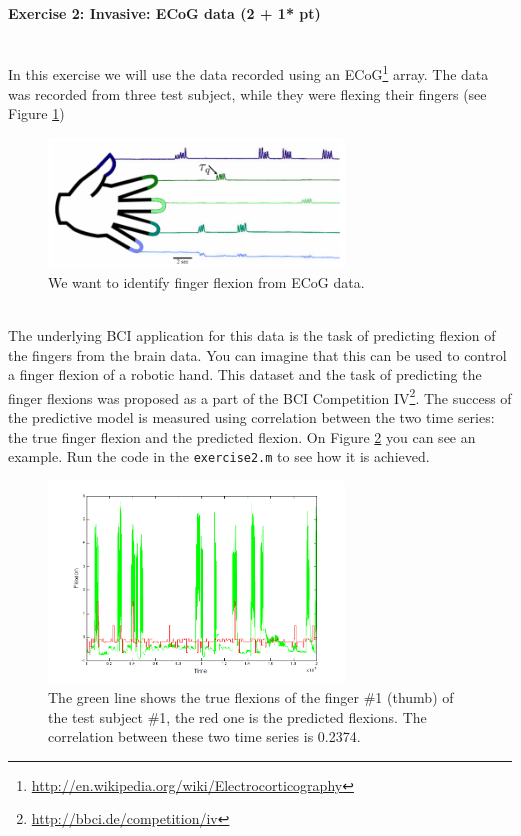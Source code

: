 \documentclass[a4paper,11pt]{article}
\newenvironment{exercise}[3]{\paragraph{Exercise #1: #2 (#3pt)}\ \\}{
\medskip}
\begin{document}
%
% 
%
\begin{exercise}{2}{Invasive: ECoG data}{2 + 1* }
In this exercise we will use the data recorded using an ECoG\footnote{\url{http://en.wikipedia.org/wiki/Electrocorticography}} array. The data was recorded from three test subject, while they were flexing their fingers (see Figure \ref{fig:fingers})
\begin{figure}[H]
   \centering
   \includegraphics[width=0.7\textwidth]{fingers.png} 
   \caption{We want to identify finger flexion from ECoG data.}
   \label{fig:fingers}
\end{figure}
\ \\
The underlying BCI application for this data is the task of predicting flexion of the fingers from the brain data. You can imagine that this can be used to control a finger flexion of a robotic hand. This dataset and the task of predicting the finger flexions was proposed as a part of the BCI Competition IV\footnote{\url{http://bbci.de/competition/iv}}. The success of the predictive model is measured using correlation between the two time series: the true finger flexion and the predicted flexion. On Figure \ref{fig:predicted} you can see an example. Run the code in the \texttt{exercise2.m} to see how it is achieved.
\begin{figure}[H]
   \centering
   \includegraphics[width=0.7\textwidth]{predicted.png} 
   \caption{The green line shows the true flexions of the finger \#1 (thumb) of the test subject \#1, the red one is the predicted flexions. The correlation between these two time series is 0.2374.}
   \label{fig:predicted}
\end{figure}


\end{exercise}
\end{document}
